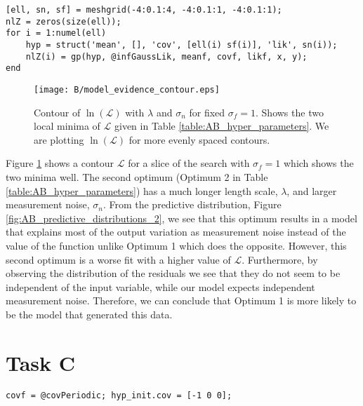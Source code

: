 \documentclass[11pt]{article}
\newcommand{\Lik}{\mathcal{L}}
\begin{document}
\begin{lstlisting}[caption=Code to sweep $\lambda$ and $\sigma_n$ to identify local minima of $\Lik$, captionpos=b, basicstyle=\small, frame=tlrb]
[ell, sn, sf] = meshgrid(-4:0.1:4, -4:0.1:1, -4:0.1:1);
nlZ = zeros(size(ell));
for i = 1:numel(ell)
    hyp = struct('mean', [], 'cov', [ell(i) sf(i)], 'lik', sn(i));
    nlZ(i) = gp(hyp, @infGaussLik, meanf, covf, likf, x, y);
end
\end{lstlisting}
\label{lst:B}

\begin{figure}[h]
    \centering
    \texttt{[image: B/model\_evidence\_contour.eps]}
    \caption{Contour of $\ln(\Lik)$ with $\lambda$ and $\sigma_n$ for fixed $\sigma_f = 1$. Shows the two local minima of $\Lik$ given in Table \ref{table:AB_hyper_parameters}. We are plotting $\ln(\Lik)$ for more evenly spaced contours.}
    \label{fig:B_marginal_liklihood_contour}
\end{figure}

Figure \ref{fig:B_marginal_liklihood_contour} shows a contour $\Lik$ for a slice of the search with $\sigma_f=1$ which shows the two minima well. The second optimum (Optimum 2 in Table \ref{table:AB_hyper_parameters}) has a much longer length scale, $\lambda$, and larger measurement noise, $\sigma_n$. From the predictive distribution, Figure \ref{fig:AB_predictive_distributions_2}, we see that this optimum results in a model that explains most of the output variation as measurement noise instead of the value of the function unlike Optimum 1 which does the opposite. However, this second optimum is a worse fit with a higher value of $\Lik$. Furthermore, by observing the distribution of the residuals we see that they do not seem to be independent of the input variable, while our model expects independent measurement noise. Therefore, we can conclude that Optimum 1 is more likely to be the model that generated this data. 

\section{Task C}

\begin{lstlisting}[caption=Code to use periodic SE covariance. Training and prediction code same as Listing \ref{lst:A}, captionpos=b, basicstyle=\small, frame=tlrb]
covf = @covPeriodic; hyp_init.cov = [-1 0 0];
\end{lstlisting}
\label{lst:C}
\end{document}
